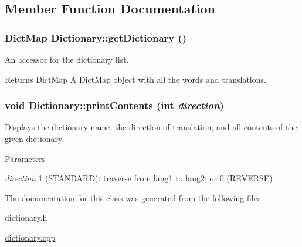 \subsection{Member Function Documentation}
\hypertarget{classDictionary_a9696c9da75da8f8bfd1a1e2ff071c343}{
\subsubsection[{getDictionary}]{\setlength{\rightskip}{0pt plus 5cm}DictMap Dictionary::getDictionary ()}}
\label{classDictionary_a9696c9da75da8f8bfd1a1e2ff071c343}
An accessor for the dictionary list. \begin{DoxyReturn}{Returns}
DictMap A DictMap object with all the words and translations. 
\end{DoxyReturn}
\hypertarget{classDictionary_ac233f319ff9eab7b54269fd1d571e146}{
\subsubsection[{printContents}]{\setlength{\rightskip}{0pt plus 5cm}void Dictionary::printContents (int {\em direction})}}
\label{classDictionary_ac233f319ff9eab7b54269fd1d571e146}
Displays the dictionary name, the direction of translation, and all contents of the given dictionary. 
\begin{DoxyParams}{Parameters}
\item[{\em direction}]1 (STANDARD): traverse from \hyperlink{structlang1}{lang1} to \hyperlink{structlang2}{lang2}; or 0 (REVERSE) \end{DoxyParams}


The documentation for this class was generated from the following files:\begin{DoxyCompactItemize}
\item 
dictionary.h\item 
\hyperlink{dictionary_8cpp}{dictionary.cpp}\end{DoxyCompactItemize}

